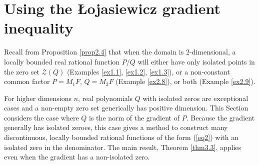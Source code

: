 \documentclass[12pt]{amsart}
\newtheorem{prop}[thm]{Proposition}
\theoremstyle{definition}
\newtheorem{notation}[thm]{Notation}
\theoremstyle{remark}
\numberwithin{equation}{section}
\newcommand{\re}{\mathbb{R}}
\newcommand{\vv}{\mathcal{Z}}
\newcommand{\glb}{\mbox{\rm glb}}
\newcommand{\boxx}{\rule{2.12mm}{3.43mm}}
\begin{document}
\section{Using the \L ojasiewicz gradient inequality}\label{sec3}

Recall from Proposition \ref{prop2.4} that when the domain is $2$-dimensional, a locally bounded real rational function $P/Q$  will either have only isolated points in the zero set $\vv(Q)$ (Examples \ref{ex1.1}, \ref{ex1.2}, \ref{ex1.3}), or a non-constant common factor $P=M_1F$, $Q=M_2F$ (Example \ref{ex2.8}), or both (Example \ref{ex2.9}).

For higher dimensions $n$, real polynomials $Q$ with isolated zeros are exceptional cases and a non-empty zero set generically has positive dimension.  This Section considers the case where $Q$ is the norm of the gradient of $P$.  Because the gradient generally has isolated zeroes, this case gives a method to construct many discontinuous, locally bounded rational functions of the form (\ref{eq2}) with an isolated zero in the denominator.  The main result, Theorem \ref{thm3.3}, applies even when the gradient has a non-isolated zero.

%
\end{document}

